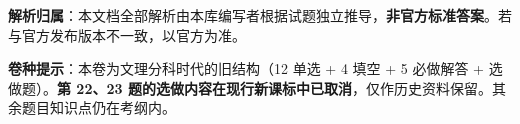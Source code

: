 

\begin{gknotice}
\textbf{解析归属}：本文档全部解析由本库编写者根据试题独立推导，\textbf{非官方标准答案}。若与官方发布版本不一致，以官方为准。

\textbf{ 卷种提示}：本卷为文理分科时代的旧结构（12 单选 + 4 填空 + 5 必做解答 + 选做题）。\textbf{第 22、23 题的选做内容在现行新课标中已取消}，仅作历史资料保留。其余题目知识点仍在考纲内。
\end{gknotice}

\par\medskip


